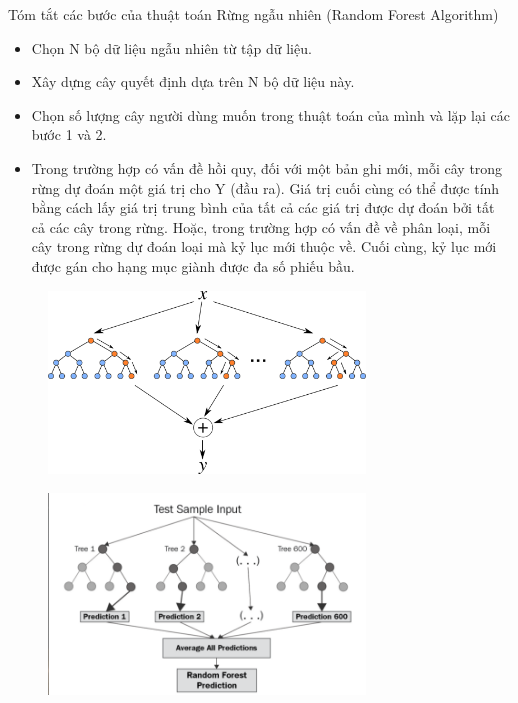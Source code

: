 \documentclass{article}
\begin{document}
	Tóm tắt các bước của thuật toán Rừng ngẫu nhiên (Random Forest Algorithm)
	\begin{itemize}
		\item Chọn N bộ dữ liệu ngẫu nhiên từ tập dữ liệu.
		
		\item Xây dựng cây quyết định dựa trên N bộ dữ liệu này.
		
		\item Chọn số lượng cây người dùng muốn trong thuật toán của mình và lặp lại các bước 1 và 2.
		
		\item Trong trường hợp có vấn đề hồi quy, đối với một bản ghi mới, mỗi cây trong rừng dự đoán một giá trị cho Y (đầu ra). Giá trị cuối cùng có thể được tính bằng cách lấy giá trị trung bình của tất cả các giá trị được dự đoán bởi tất cả các cây trong rừng. Hoặc, trong trường hợp có vấn đề về phân loại, mỗi cây trong rừng dự đoán loại mà kỷ lục mới thuộc về. Cuối cùng, kỷ lục mới được gán cho hạng mục giành được đa số phiếu bầu. 
	\end{itemize}
	\begin{figure}[H]
		\centering
		\includegraphics[width=0.75\textwidth]{images/random_forest_reg/model_overview.png}
	\end{figure}
	\begin{figure}[H]
		\centering
		\includegraphics[width=0.75\textwidth]{images/random_forest_reg/random_forest_predict.png}
	\end{figure}
\end{document}
